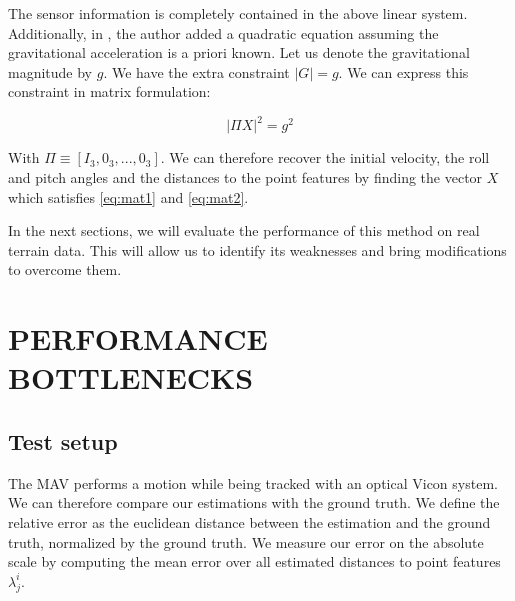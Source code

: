 \documentclass[letterpaper, 10 pt, conference]{ieeeconf}  %
\begin{document}
The sensor information is completely contained in the above linear system. Additionally, in \cite{Martinelli2014}, the author added a quadratic equation assuming the gravitational acceleration is a priori known.
Let us denote the gravitational magnitude by $g$.
We have the extra constraint $|G| = g$. We can express this constraint in matrix formulation:

\begin{equation}
\label{eq:mat2} \tag{10}
| \Pi X | ^2 = g^2
\end{equation}

\noindent With $\Pi \equiv [I_3, 0_3, ..., 0_3]$. We can therefore recover the initial velocity, the roll and pitch angles and the distances to the point features
by finding the vector $X$ which satisfies \ref{eq:mat1} and \ref{eq:mat2}.

In the next sections, we will evaluate the performance of this method on real terrain data.
This will allow us to identify its weaknesses and bring modifications to overcome them.





\section{PERFORMANCE BOTTLENECKS}

\subsection{Test setup}

The MAV performs a motion while being tracked with an optical Vicon system.
We can therefore compare our estimations with the ground truth.
We define the relative error as the euclidean distance between the estimation and the ground truth,
normalized by the ground truth.
We measure our error on the absolute scale by computing the mean error over all estimated distances to point features $\lambda_j^i$.
\end{document}
